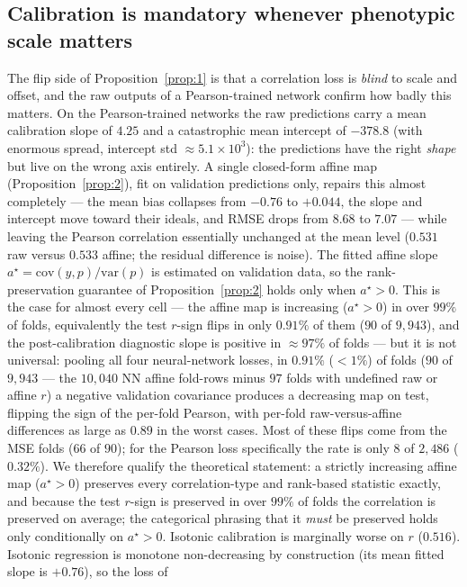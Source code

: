 \subsection{Calibration is mandatory whenever phenotypic scale matters}
The flip side of Proposition~\ref{prop:1} is that a correlation loss is
\emph{blind} to scale and offset, and the raw outputs of a Pearson-trained
network confirm how badly this matters. On the Pearson-trained networks the raw
predictions carry a mean calibration slope of $4.25$ and a catastrophic mean
intercept of $-378.8$ (with enormous spread, intercept std $\approx5.1\times10^3$):
the predictions have the right \emph{shape} but live on the wrong axis entirely. A
single closed-form affine map (Proposition~\ref{prop:2}), fit on validation
predictions only, repairs this almost completely --- the mean bias collapses from
$-0.76$ to $+0.044$, the slope and intercept move toward their ideals, and RMSE
drops from $8.68$ to $7.07$ --- while leaving the Pearson correlation essentially
unchanged at the mean level ($0.531$ raw versus $0.533$ affine; the residual
difference is noise). The fitted affine slope $a^\star=\mathrm{cov}(y,p)/
\mathrm{var}(p)$ is estimated on validation data, so the rank-preservation
guarantee of Proposition~\ref{prop:2} holds only when $a^\star>0$. This is the
case for almost every cell --- the affine map is increasing ($a^\star>0$) in over
$99\%$ of folds, equivalently the test $r$-sign flips in only $0.91\%$ of them
($90$ of $9{,}943$), and the post-calibration diagnostic slope is positive in
$\approx\!97\%$ of folds --- but it is not
universal: pooling all four neural-network losses, in $0.91\%$ ($<1\%$) of folds
($90$ of $9{,}943$ --- the $10{,}040$ NN affine fold-rows minus $97$ folds with
undefined raw or affine $r$) a negative validation covariance produces a
decreasing map on test, flipping the sign of the per-fold Pearson, with per-fold
raw-versus-affine differences as large as $0.89$ in the worst cases. Most of these
flips come from the MSE folds ($66$ of $90$); for the Pearson loss specifically the
rate is only $8$ of $2{,}486$ ($0.32\%$). We therefore qualify the theoretical
statement: a strictly increasing affine map ($a^\star>0$) preserves every
correlation-type and rank-based statistic exactly, and because the test $r$-sign is
preserved in over $99\%$ of folds the correlation is preserved on average; the
categorical phrasing that it \emph{must} be preserved holds only conditionally on
$a^\star>0$. Isotonic
calibration is marginally worse on $r$ ($0.516$). Isotonic regression is monotone
non-decreasing by construction (its mean fitted slope is $+0.76$), so the loss of
